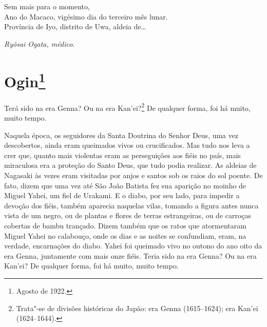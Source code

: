 \medskip

\noindent 
Sem mais para o momento,\\
Ano do Macaco, vigésimo dia do terceiro mês lunar.\\
Província de Iyo, distrito de Uwa, aldeia de\ldots{}\\

\begin{flushright}
\smallskip
\textit{Ryôsai Ogata, médico}.
\end{flushright}

\chapter{Ogin\footnote{Agosto de 1922.}}

\noindent{}Terá sido na era Genna? Ou na era Kan'ei?\footnote{ Trata"-se de divisões
históricas do Japão: era Genna (1615--1624); era Kan'ei (1624--1644).}
De qualquer forma, foi há muito, muito tempo.

Naquela época, os seguidores da Santa Doutrina do Senhor Deus, uma vez
descobertos, ainda eram queimados vivos ou crucificados. Mas tudo nos
leva a crer que, quanto mais violentas eram as perseguições aos fiéis
no país, mais miraculosa era a proteção do Santo Deus, que tudo podia
realizar. As aldeias de Nagasaki às vezes eram visitadas por anjos e
santos sob os raios do sol poente. De fato, dizem que uma vez até São
João Batista fez sua aparição no moinho de Miguel Yahei, um fiel de
Urakami. E o diabo, por seu lado, para impedir a devoção dos fiéis,
também aparecia naquelas vilas, tomando a figura antes nunca vista de
um negro, ou de plantas e flores de terras estrangeiras, ou de carroças
cobertas de bambu trançado. Dizem também que os ratos que atormentaram
Miguel Yahei no calabouço, onde os dias e as noites se confundiam, eram, na verdade,
encarnações do diabo. Yahei foi queimado vivo no outono do ano oito da
era Genna, juntamente com mais onze fiéis. Teria sido na era Genna? Ou
na era Kan'ei? De qualquer forma, foi há muito, muito tempo.


